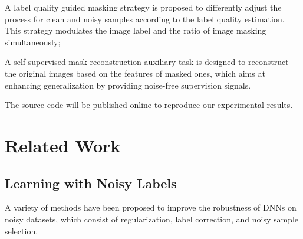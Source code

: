\documentclass[10pt,twocolumn,letterpaper]{article}
\begin{document}
 A label quality guided masking strategy is proposed to {differently adjust} the process for clean and noisy samples according to the label quality estimation{. This strategy}
modulates {the image label and the ratio of image masking} simultaneously;



 A self-supervised mask reconstruction auxiliary {task} is designed to reconstruct the original images based on the features of masked ones, which aims at enhancing generalization by providing noise-free {supervision} signals.

The source code will be published online to reproduce our experimental results.


\section{Related Work}
\subsection{Learning with Noisy Labels}


A variety of methods have been proposed to improve the robustness of DNNs on noisy datasets, which consist of regularization, label correction, and noisy sample selection. \iffalse In this section, we briefly review existing noisy sample selection and regularization based works.\fi
\end{document}
